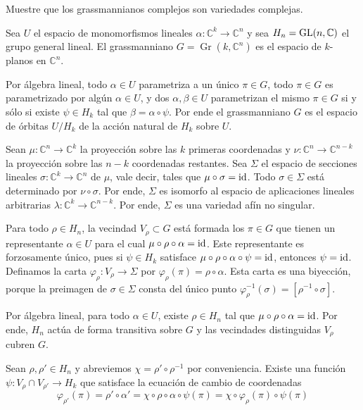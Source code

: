 \begin{problem}
Muestre que los grassmannianos complejos son variedades complejas.
\end{problem}

\begin{solution}
Sea $U$ el espacio de monomorfismos lineales $\alpha : \mathbb C^k \to \mathbb C^n$ y sea $H_n = \operatorname{GL}(n, \mathbb C)$ el grupo general lineal. El grassmanniano $G = \operatorname{Gr}(k, \mathbb C^n)$ es el espacio de $k$-planos en $\mathbb C^n$.

Por álgebra lineal, todo $\alpha \in U$ parametriza a un único $\pi \in G$, todo $\pi \in G$ es parametrizado por algún $\alpha \in U$, y dos $\alpha, \beta \in U$ parametrizan el mismo $\pi \in G$ si y sólo si existe $\psi \in H_k$ tal que $\beta = \alpha \circ \psi$. Por ende el grassmanniano $G$ es el espacio de órbitas $U / H_k$ de la acción natural de $H_k$ sobre $U$.

Sean $\mu : \mathbb C^n \to \mathbb C^k$ la proyección sobre las $k$ primeras coordenadas y $\nu : \mathbb C^n \to \mathbb C^{n-k}$ la proyección sobre las $n-k$ coordenadas restantes. Sea $\Sigma$ el espacio de secciones lineales $\sigma : \mathbb C^k \to \mathbb C^n$ de $\mu$, vale decir, tales que $\mu \circ \sigma = \operatorname{id}$. Todo $\sigma \in \Sigma$ está determinado por $\nu \circ \sigma$. Por ende, $\Sigma$ es isomorfo al espacio de aplicaciones lineales arbitrarias $\lambda : \mathbb C^k \to \mathbb C^{n-k}$. Por ende, $\Sigma$ es una variedad afín no singular.

Para todo $\rho \in H_n$, la vecindad $V_\rho \subset G$ está formada los $\pi \in G$ que tienen un representante $\alpha \in U$ para el cual $\mu \circ \rho \circ \alpha = \operatorname{id}$. Este representante es forzosamente único, pues si $\psi \in H_k$ satisface $\mu \circ \rho \circ \alpha \circ \psi = \operatorname{id}$, entonces $\psi = \operatorname{id}$. Definamos la carta $\varphi_\rho : V_\rho \to \Sigma$ por $\varphi_\rho(\pi) = \rho \circ \alpha$. Esta carta es una biyección, porque la preimagen de $\sigma \in \Sigma$ consta del único punto $\varphi_\rho^{-1}(\sigma) = [\rho^{-1} \circ \sigma]$.

Por álgebra lineal, para todo $\alpha \in U$, existe $\rho \in H_n$ tal que $\mu \circ \rho \circ \alpha = \operatorname{id}$. Por ende, $H_n$ actúa de forma transitiva sobre $G$ y las vecindades distinguidas $V_\rho$ cubren $G$.

Sean $\rho, \rho' \in H_n$ y abreviemos $\chi = \rho' \circ \rho^{-1}$ por conveniencia. Existe una función $\psi : V_\rho \cap V_{\rho'} \to H_k$ que satisface la ecuación de cambio de coordenadas
$$\varphi_{\rho'}(\pi) = \rho' \circ \alpha' = \chi \circ \rho \circ \alpha \circ \psi(\pi) = \chi \circ \varphi_\rho(\pi) \circ \psi(\pi)$$


\end{solution}
